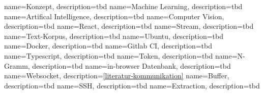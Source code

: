 {
    name=Konzept,
    description={tbd}
}
{
    name=Machine Learning,
    description={tbd}
}
{
    name=Artifical Intelligence,
    description={tbd}
}
{
    name=Computer Vision,
    description={tbd}
}
{
    name=React,
    description={tbd}
}
{
    name=Stream,
    description={tbd}
}
{
    name=Text-Korpus,
    description={tbd}
}
{
    name=Ubuntu,
    description={tbd}
}
{
    name=Docker,
    description={tbd}
}
{
    name=Gitlab CI,
    description={tbd}
}
{
    name=Typescript,
    description={tbd}
}
{
    name=Token,
    description={tbd}
}
{
    name=N-Gramm,
    description={tbd}
}
{
    name=in-browser Datenbank,
    description={tbd}
}
{
    name=Websocket,
    description={\autoref{literatur-kommunikation}}
}
{
    name=Buffer,
    description={tbd}
}
{
    name=SSH,
    description={tbd}
}
{
    name=Extraction,
    description={tbd}
}


\renewcommand{\glstextformat}[1]{\textbf{\itshape #1}}




